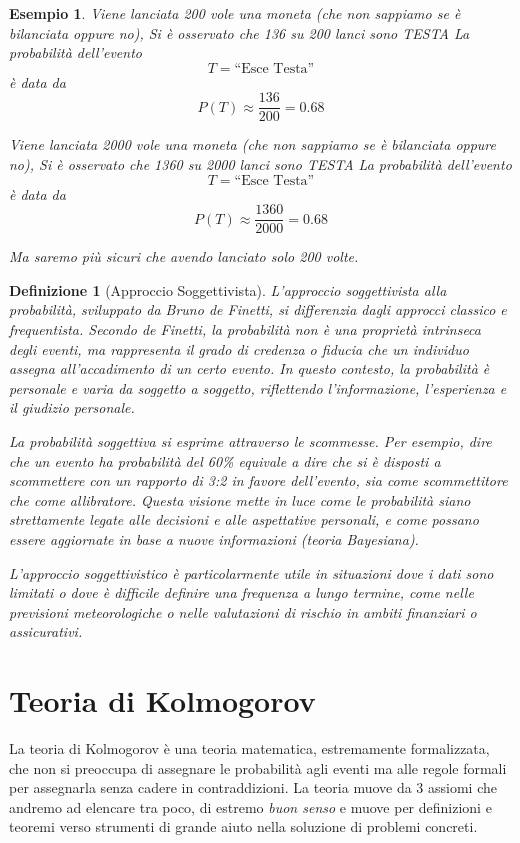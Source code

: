 \documentclass[
  11pt,
]{book}
\theoremstyle{mytheoremstyle}
\theoremstyle{mydefstyle}
\newtheorem{definition}{Definizione}[section]
\newtheorem{example}{{Esempio}}[section]
\begin{document}
\begin{example}
Viene lanciata 200 vole una moneta (che non sappiamo se è bilanciata
oppure no), Si è osservato che 136 su 200 lanci sono TESTA La
probabilità dell'evento \[
T =\text{“Esce Testa''}
\] è data da
\[
P(T)\approx\frac{136}{200}=0.68
\]

Viene lanciata 2000 vole una moneta (che non sappiamo se è bilanciata
oppure no), Si è osservato che 1360 su 2000 lanci sono TESTA La
probabilità dell'evento
\[
T =\text{“Esce Testa''}
\]
è data da
\[
P(T)\approx\frac{1360}{2000}=0.68
\]

Ma saremo più \emph{sicuri} che avendo lanciato solo 200 volte.
\end{example}

\begin{definition}[Approccio Soggettivista]
\leavevmode

L'approccio soggettivista alla probabilità, sviluppato da Bruno de
Finetti, si differenzia dagli approcci classico e frequentista. Secondo
de Finetti, la probabilità non è una proprietà intrinseca degli eventi,
ma rappresenta il grado di credenza o fiducia che un individuo assegna
all'accadimento di un certo evento. In questo contesto, la probabilità è
personale e varia da soggetto a soggetto, riflettendo l'informazione,
l'esperienza e il giudizio personale.

La probabilità soggettiva si esprime attraverso le scommesse. Per
esempio, dire che un evento ha probabilità del 60\% equivale a dire che
si è disposti a scommettere con un rapporto di 3:2 in favore
dell'evento, sia come scommettitore che come allibratore.
Questa visione mette in luce come le probabilità siano
strettamente legate alle decisioni e alle aspettative personali, e come
possano essere aggiornate in base a nuove informazioni (teoria
Bayesiana).

L'approccio soggettivistico è particolarmente utile in situazioni dove i
dati sono limitati o dove è difficile definire una frequenza a lungo
termine, come nelle previsioni meteorologiche o nelle valutazioni di
rischio in ambiti finanziari o assicurativi.

\end{definition}

\section{Teoria di Kolmogorov}\label{teoria-di-kolmogorov}

La teoria di Kolmogorov è una teoria matematica, estremamente
formalizzata, che non si preoccupa di assegnare le probabilità agli
eventi ma alle regole formali per assegnarla senza cadere in
contraddizioni. La teoria muove da 3 assiomi che andremo ad elencare tra
poco, di estremo \emph{buon senso} e muove per definizioni e teoremi verso
strumenti di grande aiuto nella soluzione di problemi concreti.
\end{document}
